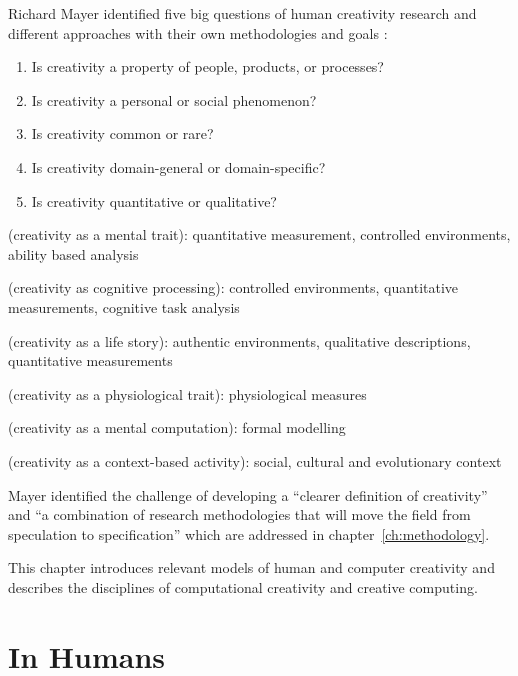 Richard Mayer identified five big questions of human creativity research and different approaches with their own methodologies and goals \citeyear[p.450-451,453]{Mayer1999}:

\label{s:Mayer5questions}
\begin{enumerate}
  \item Is creativity a property of people, products, or processes?
  \item Is creativity a personal or social phenomenon?
  \item Is creativity common or rare?
  \item Is creativity domain-general or domain-specific?
  \item Is creativity quantitative or qualitative?
\end{enumerate}

\begin{description}[leftmargin=3.5cm]
  \item [Psychometric] (creativity as a mental trait): quantitative measurement, controlled environments, ability based analysis
  \item [Psychological] (creativity as cognitive processing): controlled environments, quantitative measurements, cognitive task analysis
  \item [Biographical] (creativity as a life story): authentic environments, qualitative descriptions, quantitative measurements
  \item [Biological] (creativity as a physiological trait): physiological measures
  \item [Computational] (creativity as a mental computation): formal modelling
  \item [Contextual] (creativity as a context-based activity): social, cultural and evolutionary context
\end{description}

Mayer identified the challenge of developing a ``clearer definition of creativity'' and ``a combination of research methodologies that will move the field from speculation to specification'' \citeyear[p.459]{Mayer1999} which are addressed in chapter~\ref{ch:methodology}.

This chapter introduces relevant models of human and computer creativity and describes the disciplines of computational creativity and creative computing.


\section{In Humans}
\label{s:humancreativity}

